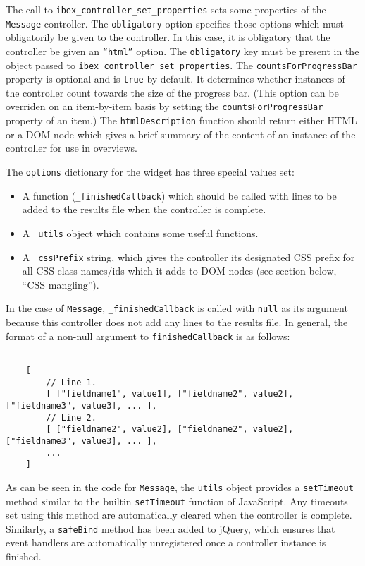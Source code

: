 \documentclass[11pt,letterpaper]{article}
\begin{document}
\smallskip\noindent\normalsize

The call to \texttt{ibex\_controller\_set\_properties} sets some properties of the \texttt{Message} controller.
The \texttt{obligatory} option specifies those options which must obligatorily be
given to the controller. In this case, it is obligatory that the controller
be given an \texttt{``html''} option. The \texttt{obligatory} key must be present in the object
passed to \texttt{ibex\_controller\_set\_properties}.
The \texttt{countsForProgressBar} property is optional and is \texttt{true}
by default. It determines whether instances of the controller count towards
the size of the progress bar. (This option can be overriden on an item-by-item
basis by setting the \texttt{countsForProgressBar} property of an item.)
The \texttt{htmlDescription} function should return
either HTML or a DOM node which gives a brief summary of the content of
an instance of the controller for use in overviews.

The \texttt{options} dictionary for the widget has three special values set:
\begin{itemize}

\item
 A function (\texttt{\_finishedCallback}) which should be called with lines to be added to the results file when the controller is complete.
\item
 A \texttt{\_utils} object which contains some useful functions.
\item
 A \texttt{\_cssPrefix} string, which gives the controller its designated CSS prefix for all CSS class names/ids which it adds to DOM nodes (see section below, ``CSS mangling'').
\end{itemize}
In the case of \texttt{Message}, \texttt{\_finishedCallback} is called with \texttt{null} as its argument
because this controller does not add any lines to the results file.
In general, the format of a non-null argument to \texttt{finishedCallback} is as follows:
\footnotesize\begin{verbatim}

    [
        // Line 1.
        [ ["fieldname1", value1], ["fieldname2", value2], ["fieldname3", value3], ... ],
        // Line 2.
        [ ["fieldname2", value2], ["fieldname2", value2], ["fieldname3", value3], ... ],
        ...
    ]
\end{verbatim}

\smallskip\noindent\normalsize


As can be seen in the code for \texttt{Message}, the \texttt{utils} object provides a \texttt{setTimeout} method
similar to the builtin \texttt{setTimeout} function of JavaScript.
Any timeouts set using this method are automatically cleared when the controller is complete.
Similarly, a \texttt{safeBind} method has been added to jQuery, which ensures that event handlers
are automatically unregistered once a controller instance is finished.
\end{document}
